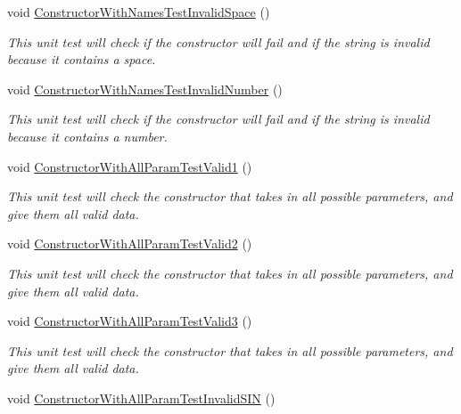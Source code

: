 \begin{DoxyCompactItemize}
void \hyperlink{class_my_all_employee_1_1_tests_1_1_employee_tests_a631ee75ab21985aba7c38247a0bb3f2e}{Constructor\+With\+Names\+Test\+Invalid\+Space} ()
\begin{DoxyCompactList}\small\item\em This unit test will check if the constructor will fail and if the string is invalid because it contains a space. \end{DoxyCompactList}\item 
void \hyperlink{class_my_all_employee_1_1_tests_1_1_employee_tests_a2f4da21d02d8e126a72d869a2af7f56c}{Constructor\+With\+Names\+Test\+Invalid\+Number} ()
\begin{DoxyCompactList}\small\item\em This unit test will check if the constructor will fail and if the string is invalid because it contains a number. \end{DoxyCompactList}\item 
void \hyperlink{class_my_all_employee_1_1_tests_1_1_employee_tests_a7890c0db13ca221a80eddfb68861eee5}{Constructor\+With\+All\+Param\+Test\+Valid1} ()
\begin{DoxyCompactList}\small\item\em This unit test will check the constructor that takes in all possible parameters, and give them all valid data. \end{DoxyCompactList}\item 
void \hyperlink{class_my_all_employee_1_1_tests_1_1_employee_tests_acb3a7727aeb8ed45f0fcd462233afd34}{Constructor\+With\+All\+Param\+Test\+Valid2} ()
\begin{DoxyCompactList}\small\item\em This unit test will check the constructor that takes in all possible parameters, and give them all valid data. \end{DoxyCompactList}\item 
void \hyperlink{class_my_all_employee_1_1_tests_1_1_employee_tests_af07472233dc8fafad82d768d8cd55571}{Constructor\+With\+All\+Param\+Test\+Valid3} ()
\begin{DoxyCompactList}\small\item\em This unit test will check the constructor that takes in all possible parameters, and give them all valid data. \end{DoxyCompactList}\item 
void \hyperlink{class_my_all_employee_1_1_tests_1_1_employee_tests_ad15721c3192881537aabecfe234d4e97}{Constructor\+With\+All\+Param\+Test\+Invalid\+S\+I\+N} ()

\end{DoxyCompactItemize}
